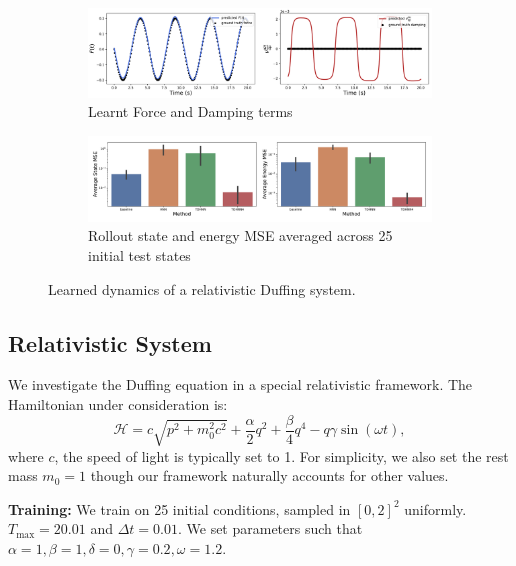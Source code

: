 \documentclass{article}
\begin{document}
\begin{figure}[h!]
\centering
\captionsetup{justification=centering}
	\begin{subfigure}[b]{0.48\textwidth}
		\centering
		\includegraphics[width=\textwidth]{figures/figures/relativity/1/relativity_dpdt_new_0.pdf}
		\caption{Learnt Force and Damping terms}
	\end{subfigure}
	\begin{subfigure}[b]{0.48\textwidth}
	    \centering
		\includegraphics[width=\textwidth]{figures/figures/relativity/1/relativity_errors_0.pdf}
		\caption{Rollout state and energy MSE averaged across 25 initial test states}
	\end{subfigure}
\caption{Learned dynamics of a relativistic Duffing system.}
\end{figure}
\subsection{Relativistic System}
We investigate the Duffing equation in a special relativistic framework. The Hamiltonian under consideration is:
\begin{equation}
\mathcal{H} =  c\sqrt{p^2 +m_0^2c^2} + \frac{\alpha}{2}q^2 +\frac{\beta}{4}q^4 - q\gamma\sin(\omega t),
\end{equation}
where $c$, the speed of light is typically set to 1. For simplicity, we also set the rest mass $m_0=1$ though our framework naturally accounts for other values.

\textbf{Training:} We train on 25 initial conditions, sampled in $[0,2]^2$ uniformly. $T_{\max} = 20.01$ and $\Delta t = 0.01$. We set parameters such that $\alpha =1, \beta =1,\delta =0,\gamma = 0.2,\omega = 1.2$.
\end{document}
